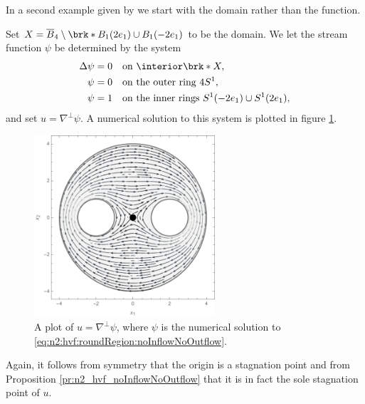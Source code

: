 In a second example given by \cite{Wahlen2023} we start with the domain rather than the function.
\begin{example}
Set $X=\overline{B}_4\setminus\brk*{B_1(2e_1)\cup B_1(-2e_1)}$ to be the domain.
  We let the stream function $\psi$ be determined by the system
  \begin{equation}
    \begin{aligned}
      \Delta \psi&=0 &&\text{on }\openX, \\
      \psi&=0 &&\text{on the outer ring }4S^1, \\
      \psi&=1 &&\text{on the inner rings }S^1(-2e_1)\cup S^1(2e_1),
    \end{aligned}\label{eq:n2:hvf:roundRegion:noInflowNoOutflow}
  \end{equation}
  and set $u=\nabla^\perp\psi$.
  A numerical solution to this system is plotted in figure \ref{pl:n2_hvf_roundRegion_noInflowNoOutflow}.
  \begin{figure}
    \centering
    \includegraphics[width=0.6\textwidth]{../Plots/n2_hvf_roundRegion_noInflowNoOutflow_gray_2.pdf}
    \caption{A plot of $u=\nabla^\perp\psi$, where $\psi$ is the numerical solution to
    \eqref{eq:n2:hvf:roundRegion:noInflowNoOutflow}.}
    \label{pl:n2_hvf_roundRegion_noInflowNoOutflow}
  \end{figure}
  Again, it follows from symmetry that the origin is a stagnation point and
  from Proposition \ref{pr:n2_hvf_noInflowNoOutflow} that it is in fact the sole stagnation point of $u$.
\end{example}

